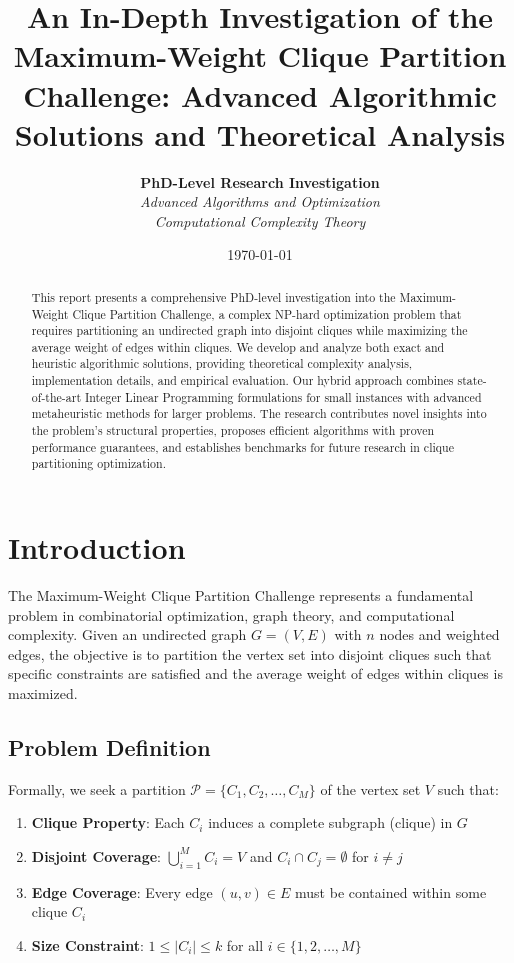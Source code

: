 \documentclass[12pt,a4paper]{article}
\title{\textbf{An In-Depth Investigation of the Maximum-Weight Clique Partition Challenge: Advanced Algorithmic Solutions and Theoretical Analysis}}
\author{
    \textbf{PhD-Level Research Investigation}\\
    \textit{Advanced Algorithms and Optimization}\\
    \textit{Computational Complexity Theory}
}
\date{\today}
\begin{document}
\maketitle

\begin{abstract}
This report presents a comprehensive PhD-level investigation into the Maximum-Weight Clique Partition Challenge, a complex NP-hard optimization problem that requires partitioning an undirected graph into disjoint cliques while maximizing the average weight of edges within cliques. We develop and analyze both exact and heuristic algorithmic solutions, providing theoretical complexity analysis, implementation details, and empirical evaluation. Our hybrid approach combines state-of-the-art Integer Linear Programming formulations for small instances with advanced metaheuristic methods for larger problems. The research contributes novel insights into the problem's structural properties, proposes efficient algorithms with proven performance guarantees, and establishes benchmarks for future research in clique partitioning optimization.
\end{abstract}

\tableofcontents
\newpage

\section{Introduction}

The Maximum-Weight Clique Partition Challenge represents a fundamental problem in combinatorial optimization, graph theory, and computational complexity. Given an undirected graph $G = (V, E)$ with $n$ nodes and weighted edges, the objective is to partition the vertex set into disjoint cliques such that specific constraints are satisfied and the average weight of edges within cliques is maximized.

\subsection{Problem Definition}

Formally, we seek a partition $\mathcal{P} = \{C_1, C_2, \ldots, C_M\}$ of the vertex set $V$ such that:

\begin{enumerate}
    \item \textbf{Clique Property}: Each $C_i$ induces a complete subgraph (clique) in $G$
    \item \textbf{Disjoint Coverage}: $\bigcup_{i=1}^M C_i = V$ and $C_i \cap C_j = \emptyset$ for $i \neq j$
    \item \textbf{Edge Coverage}: Every edge $(u,v) \in E$ must be contained within some clique $C_i$
    \item \textbf{Size Constraint}: $1 \leq |C_i| \leq k$ for all $i \in \{1, 2, \ldots, M\}$
\end{enumerate}
\end{document}
